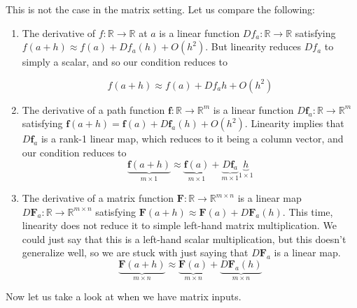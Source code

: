   This is not the case in the matrix setting. Let us compare the following: 
  \begin{enumerate}
    \item The derivative of $f: \mathbb{R} \rightarrow \mathbb{R}$ at $a$ is a linear function $D f_a: \mathbb{R} \longrightarrow \mathbb{R}$ satisfying $f(a + h) \approx f(a) + D f_a (h) + O(h^2)$. But linearity reduces $D f_a$ to simply a scalar, and so our condition reduces to 
    
    \[f(a + h) \approx f(a) + D f_a h + O(h^2)\]
    
    \item The derivative of a path function $\mathbf{f}: \mathbb{R} \rightarrow \mathbb{R}^m$ is a linear function $D \mathbf{f}_a : \mathbb{R} \longrightarrow \mathbb{R}^m$ satisfying $\mathbf{f}(a + h) = \mathbf{f}(a) + D \mathbf{f}_a (h) + O(h^2)$. Linearity implies that $D \mathbf{f}_a$ is a rank-1 linear map, which reduces to it being a column vector, and our condition reduces to 
    \[\underbrace{\mathbf{f}(a + h)}_{m \times 1} \approx \underbrace{\mathbf{f}(a)}_{m \times 1} + \underbrace{D \mathbf{f}_a}_{m \times 1} \underbrace{h}_{1 \times 1}\]
    
    \item The derivative of a matrix function $\mathbf{F}: \mathbb{R} \rightarrow \mathbb{R}^{m \times n}$ is a linear map $D \mathbf{F}_a: \mathbb{R} \longrightarrow \mathbb{R}^{m \times n}$ satisfying $\mathbf{F}(a + h) \approx \mathbf{F}(a) + D \mathbf{F}_a (h)$. This time, linearity does not reduce it to simple left-hand matrix multiplication. We could just say that this is a left-hand scalar multiplication, but this doesn't generalize well, so we are stuck with just saying that $D \mathbf{F}_a$ is a linear map. 
    \[\underbrace{\mathbf{F}(a + h)}_{m \times n} \approx \underbrace{\mathbf{F}(a)}_{m \times n} + \underbrace{D \mathbf{F}_a (h)}_{m \times n}\]
  \end{enumerate}
  Now let us take a look at when we have matrix inputs. 
